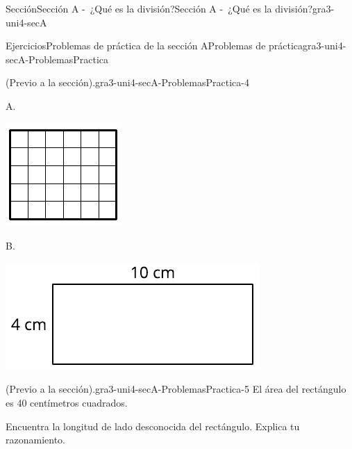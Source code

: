 \documentclass[twoside,10pt,]{article}
\begin{document}
\begin{sectionptx}{Sección}{Sección A -~¿Qué es la división?}{}{Sección A -~¿Qué es la división?}{}{}{gra3-uni4-secA}
\begin{exercises-subsection}{Ejercicios}{Problemas de práctica de la sección A}{}{Problemas de práctica}{}{}{gra3-uni4-secA-ProblemasPractica}
\begin{divisionexercise}{2}{(Previo a la sección).}{}{gra3-uni4-secA-ProblemasPractica-4}
\begin{sidebyside}{2}{0.05}{0.05}{0.1}
\begin{sbspanel}{0.3}
A.%
\par
\includegraphics[width=\linewidth]{external/svg-source/tikz-file-151669-scale13.pdf}
\end{sbspanel}%
\begin{sbspanel}{0.5}%
B.%
\par
\includegraphics[width=\linewidth]{external/svg-source/tikz-file-151670-scale13.pdf}
\end{sbspanel}%
\end{sidebyside}%
\end{divisionexercise}%
\begin{divisionexercise}{3}{(Previo a la sección).}{}{gra3-uni4-secA-ProblemasPractica-5}%
El área del rectángulo es 40 centímetros cuadrados.%
\begin{sidebyside}{2}{0}{0}{0}%
\begin{sbspanel}{0.5}%
Encuentra la longitud de lado desconocida del rectángulo. Explica tu razonamiento.%

\end{sbspanel}
\end{sidebyside}
\end{divisionexercise}
\end{exercises-subsection}
\end{sectionptx}
\end{document}

